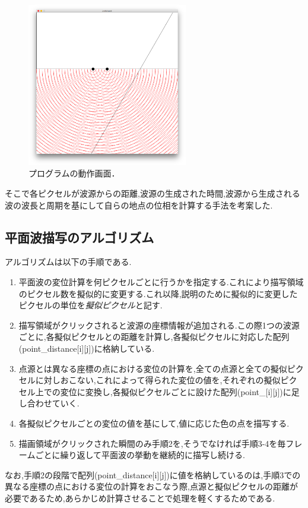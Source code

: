 \begin{figure}[H]
 \begin{center}
  \includegraphics[width=70mm]{../implement/miss_draw.png}
 \end{center}
 \caption{プログラムの動作画面．}
 \label{fig:missdraw}
\end{figure}
そこで各ピクセルが波源からの距離,波源の生成された時間,波源から生成される波の波長と周期を基にして自らの地点の位相を計算する手法を考案した.

\subsection{平面波描写のアルゴリズム} 
\label{sec:algo}
アルゴリズムは以下の手順である.
\begin{enumerate}
 \item 平面波の変位計算を何ピクセルごとに行うかを指定する.これにより描写領域のピクセル数を擬似的に変更する.これ以降,説明のために擬似的に変更したピクセルの単位を\emph{擬似ピクセル}と記す.
  \item 描写領域がクリックされると波源の座標情報が追加される.この際1つの波源ごとに,各擬似ピクセルとの距離を計算し,各擬似ピクセルに対応した配列(point\_distance[i][j])に格納している.
  \item 点源とは異なる座標の点における変位の計算を,全ての点源と全ての擬似ピクセルに対しおこない,これによって得られた変位の値を,それぞれの擬似ピクセル上での変位に変換し,各擬似ピクセルごとに設けた配列(point\_[i][j])に足し合わせていく.
  \item 各擬似ピクセルごとの変位の値を基にして,値に応じた色の点を描写する.
 \item 描画領域がクリックされた瞬間のみ手順2を,そうでなければ手順3-4を毎フレームごとに繰り返して平面波の挙動を継続的に描写し続ける.
 \end{enumerate}
 なお,手順2の段階で配列(point\_distance[i][j])に値を格納しているのは,手順3での異なる座標の点における変位の計算をおこなう際,点源と擬似ピクセルの距離が必要であるため,あらかじめ計算させることで処理を軽くするためである.

